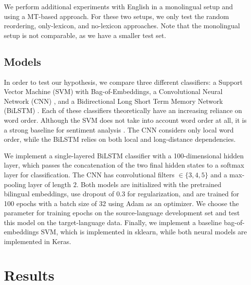 \documentclass[11pt,a4paper]{article}
\begin{document}
We perform additional experiments with English in a monolingual setup and using a MT-based approach. For these two setups, we only test the random reordering, only-lexicon, and no-lexicon approaches. Note that the monolingual setup is not comparable, as we have a smaller test set.

\subsection{Models}

In order to test our hypothesis, we compare three different classifiers: a Support Vector Machine (SVM) with Bag-of-Embeddings, a Convolutional Neural Network (CNN) \cite{Santos2014,Severyn2015}, and a Bidirectional Long Short Term Memory Network (BiLSTM) \cite{Luong2015}. Each of these classifiers theoretically have an increasing reliance on word order. Although the SVM does not take into account word order at all, it is a strong baseline for sentiment analysis \cite{Kiritchenko2014c}. The CNN considers only local word order, while the BiLSTM relies on both local and long-distance dependencies.

We implement a single-layered BiLSTM classifier with a 100-dimensional hidden layer, which passes the concatenation of the two final hidden states to a softmax layer for classification. The CNN has convolutional filters $\in \{3,4,5\}$ and a max-pooling layer of length $2$. Both models are initialized with the pretrained bilingual embeddings, use dropout of $0.3$ for regularization, and are trained for 100 epochs with a batch size of 32 using Adam as an optimizer. We choose the parameter for training epochs on the source-language development set and test this model on the target-language data. Finally, we implement a baseline bag-of-embeddings SVM, which is implemented in sklearn, while both neural models are implemented in Keras.

\section{Results}
\end{document}
